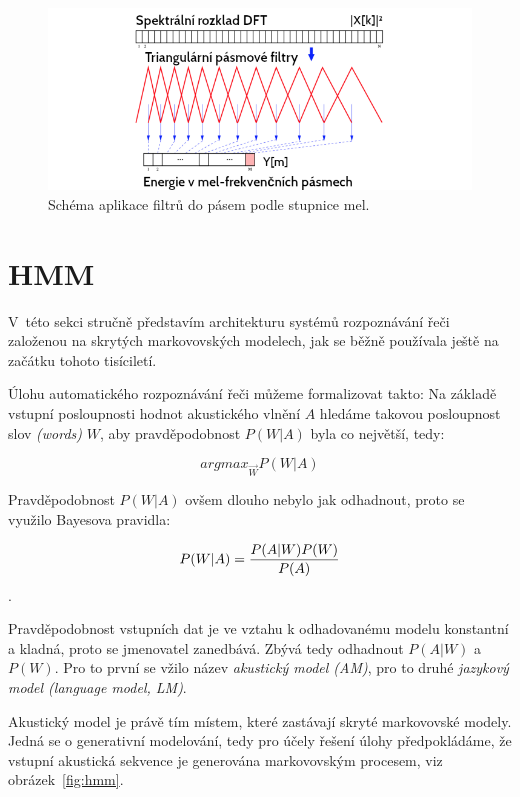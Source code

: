 \begin{figure}[htpb]
\includegraphics[scale=0.58]{rc/mfcc-mels.png}
\caption{
    Schéma aplikace filtrů do pásem podle stupnice mel.
}
\label{fig:mfcc-mels}
\end{figure}

\section{HMM}

V~této sekci stručně představím architekturu systémů rozpoznávání řeči založenou
na skrytých markovovských modelech, jak se běžně používala ještě na začátku
tohoto tisíciletí.

Úlohu automatického rozpoznávání řeči můžeme formalizovat takto: Na základě vstupní
posloupnosti hodnot akustického vlnění $A$ hledáme takovou posloupnost slov
\textit{(words)} $W$, aby pravděpodobnost $P(W|A)$ byla co největší, tedy:

\begin{equation}
argmax_{\vec{W}} P(W|A)
\end{equation}

Pravděpodobnost $P(W|A)$ ovšem dlouho nebylo jak odhadnout, proto se využilo
Bayesova pravidla:

\begin{equation}
P(W|A) = {{P(A|W) P(W)}\over{P(A)}}
\end{equation}.

Pravděpodobnost vstupních dat je ve vztahu k odhadovanému modelu konstantní a
kladná, proto se jmenovatel zanedbává. Zbývá tedy odhadnout $P(A|W)$ a $P(W)$.
Pro to první se vžilo název \textit{akustický model (AM)}, pro to druhé
\textit{jazykový model (language model, LM)}.

Akustický model je právě tím místem, které zastávají skryté markovovské modely.
Jedná se o generativní modelování, tedy pro účely řešení úlohy předpokládáme, že
vstupní akustická sekvence je generována markovovským procesem, viz
obrázek~\ref{fig:hmm}.

